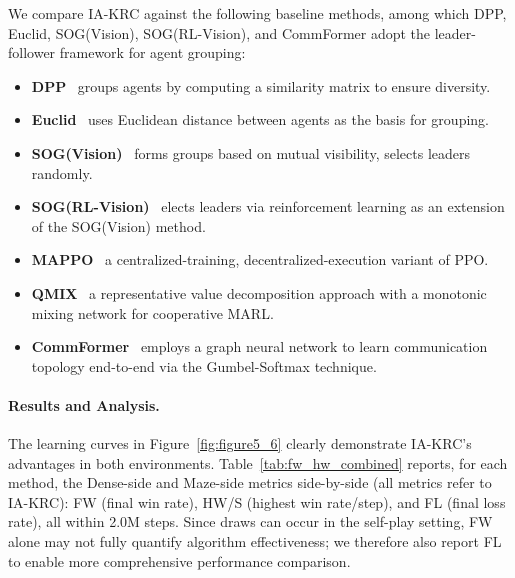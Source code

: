 \documentclass[10pt]{article} %
\begin{document}
We compare IA-KRC against the following baseline methods, among which DPP, Euclid, SOG(Vision), SOG(RL-Vision), and CommFormer adopt the leader-follower framework for agent grouping:

\begin{itemize}
    \item \textbf{DPP}~\cite{yang2020multi} groups agents by computing a similarity matrix to ensure diversity.
    \item \textbf{Euclid}~\cite{huttenrauch2019deep} uses Euclidean distance between agents as the basis for grouping.
    \item \textbf{SOG(Vision)}~\cite{shao2022self} forms groups based on mutual visibility, selects leaders randomly.
    \item \textbf{SOG(RL-Vision)}~\cite{shao2022self} elects leaders via reinforcement learning as an extension of the SOG(Vision) method. 
    \item \textbf{MAPPO}~\cite{yu2022surprising} a centralized-training, decentralized-execution variant of PPO.
    \item \textbf{QMIX}~\cite{rashid2020monotonic} a representative value decomposition approach with a monotonic mixing network for cooperative MARL.
    \item \textbf{CommFormer}~\cite{hu2024learning} employs a graph neural network to learn communication topology end-to-end via the Gumbel-Softmax technique.
\end{itemize}

\vspace{-6pt}
\paragraph{Results and Analysis.} 
The learning curves in Figure~\ref{fig:figure5_6} clearly demonstrate IA-KRC's advantages in both environments. Table~\ref{tab:fw_hw_combined} reports, for each method, the Dense-side and Maze-side metrics side-by-side (all metrics refer to IA-KRC): FW (final win rate), HW/S (highest win rate/step), and FL (final loss rate), all within 2.0M steps. Since draws can occur in the self-play setting, FW alone may not fully quantify algorithm effectiveness; we therefore also report FL to enable more comprehensive performance comparison.
\end{document}
